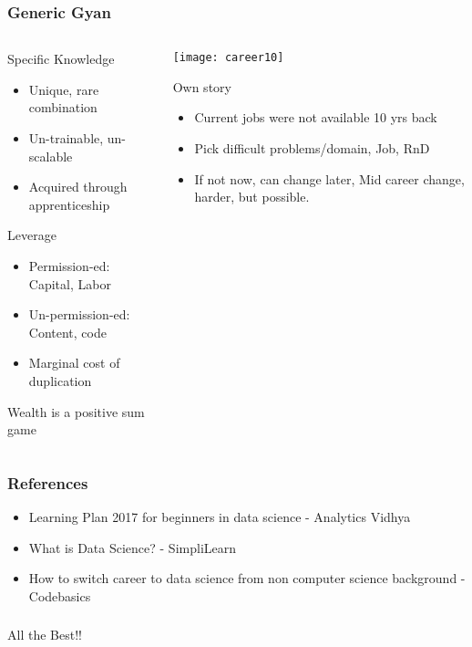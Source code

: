 \begin{frame}[fragile]\frametitle{Generic Gyan}
\begin{columns}
    \begin{column}[T]{0.4\linewidth}
			Specific Knowledge

      \begin{itemize}
			\item Unique, rare combination
			\item Un-trainable, un-scalable
			\item Acquired through apprenticeship
			\end{itemize}
			
			Leverage
      \begin{itemize}
			\item Permission-ed: Capital, Labor
			\item Un-permission-ed: Content, code
			\item Marginal cost of duplication
			\end{itemize}
			
			Wealth is a positive sum game
			
    \end{column}
    \begin{column}[T]{0.6\linewidth}
		
			\begin{center}
			\texttt{[image: career10]}
			\end{center}

			Own story
      \begin{itemize}
			\item Current jobs were not available 10 yrs back
			\item Pick difficult problems/domain, Job, RnD
			\item If not now, can change later, Mid career change, harder, but possible.
			\end{itemize}		
    \end{column}
  \end{columns}
	
\end{frame}

\begin{frame}[fragile]\frametitle{References}
\begin{itemize}
\item Learning Plan 2017 for beginners in data science - Analytics Vidhya
\item What is Data Science? - SimpliLearn
\item How to switch career to data science from non computer science background - Codebasics
\end{itemize}
\end{frame}


\begin{frame}[fragile]\frametitle{}
	
	\begin{center}
	{\Large All the Best!!}
	\end{center}
	
\end{frame}

